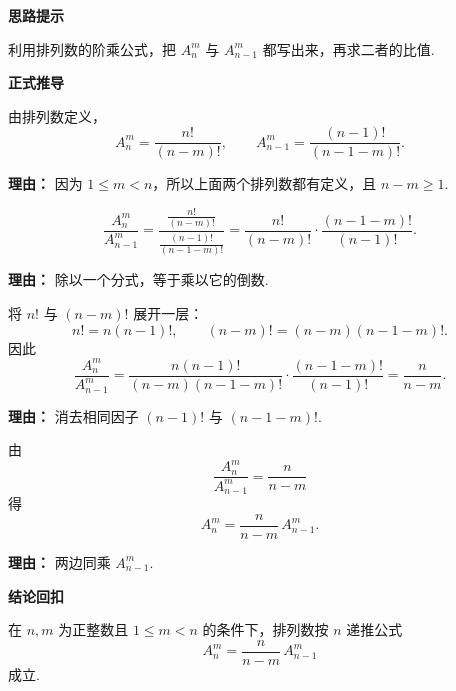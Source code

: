 \begin{proofbox}
\textbf{\textcolor{CProof}{思路提示}}\par
利用排列数的阶乘公式，把 $A_n^m$ 与 $A_{n-1}^m$ 都写出来，再求二者的比值.

\medskip
\textbf{\textcolor{CProof}{正式推导}}
\begin{description}[style=nextline, leftmargin=2.8em, labelsep=0.5em, itemsep=0.55em]
  \item[\textbf{步骤一（写出阶乘形式）：}]
  由排列数定义，
  \[
    A_n^m=\frac{n!}{(n-m)!},\qquad
    A_{n-1}^m=\frac{(n-1)!}{(n-1-m)!}.
  \]
  \par\textbf{理由：} 因为 $1\le m<n$，所以上面两个排列数都有定义，且 $n-m\ge1$.

  \item[\textbf{步骤二（计算比值）：}]
  \[
    \frac{A_n^m}{A_{n-1}^m}
    =\frac{\frac{n!}{(n-m)!}}{\frac{(n-1)!}{(n-1-m)!}}
    =\frac{n!}{(n-m)!}\cdot\frac{(n-1-m)!}{(n-1)!}.
  \]
  \par\textbf{理由：} 除以一个分式，等于乘以它的倒数.

  \item[\textbf{步骤三（化简阶乘）：}]
  将 $n!$ 与 $(n-m)!$ 展开一层：
  \[
    n!=n(n-1)!,\qquad
    (n-m)!=(n-m)(n-1-m)!.
  \]
  因此
  \[
    \frac{A_n^m}{A_{n-1}^m}
    =\frac{n(n-1)!}{(n-m)(n-1-m)!}\cdot\frac{(n-1-m)!}{(n-1)!}
    =\frac{n}{n-m}.
  \]
  \par\textbf{理由：} 消去相同因子 $(n-1)!$ 与 $(n-1-m)!$.

  \item[\textbf{步骤四（回代得递推）：}]
  由
  \[
    \frac{A_n^m}{A_{n-1}^m}=\frac{n}{n-m}
  \]
  得
  \[
    A_n^m=\frac{n}{n-m}\,A_{n-1}^m.
  \]
  \par\textbf{理由：} 两边同乘 $A_{n-1}^m$.
\end{description}

\medskip
\textbf{\textcolor{CProof}{结论回扣}}\par
在 $n,m$ 为正整数且 $1\le m<n$ 的条件下，排列数按 $n$ 递推公式
\[
  A_n^m=\frac{n}{n-m}\,A_{n-1}^m
\]
成立.
\end{proofbox}
